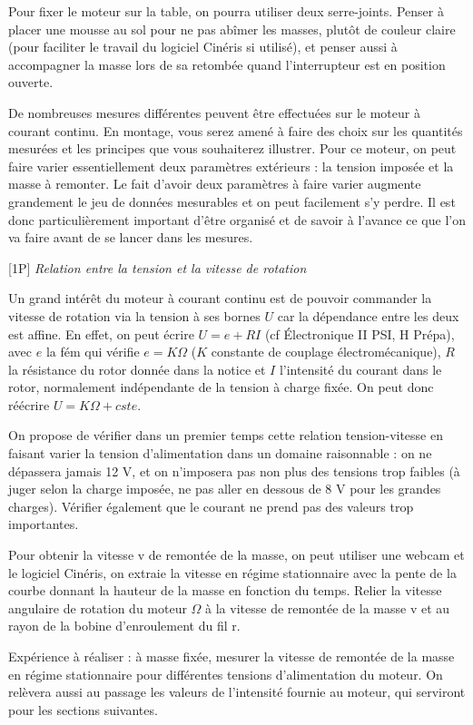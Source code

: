 \documentclass{article}%
\begin{document}
Pour fixer le moteur sur la table, on pourra utiliser deux serre-joints. Penser à placer une mousse au sol pour ne pas abîmer les masses, plutôt de couleur claire (pour faciliter le travail du logiciel Cinéris si utilisé), et penser aussi à accompagner la masse lors de sa retombée quand l'interrupteur est en position ouverte.

De nombreuses mesures différentes peuvent être effectuées sur le moteur à courant continu. En montage, vous serez amené à faire des choix sur les quantités mesurées et les principes que vous souhaiterez illustrer. Pour ce moteur, on peut faire varier essentiellement deux paramètres extérieurs : la tension imposée et la masse à remonter. Le fait d'avoir deux paramètres à faire varier augmente grandement le jeu de données mesurables et on peut facilement s'y perdre. Il est donc particulièrement important d'être organisé et de savoir à l'avance ce que l'on va faire avant de se lancer dans les mesures.

[1P] \textit{Relation entre la tension et la vitesse de rotation}

Un grand intérêt du moteur à courant continu est de pouvoir commander la vitesse de rotation via la tension à ses bornes $U$ car la dépendance entre les deux est affine. En effet, on peut écrire $U = e + RI$ (cf Électronique II PSI, H Prépa), avec $e$ la fém qui vérifie $e = K \Omega$ ($K$ constante de couplage électromécanique), $R$ la résistance du rotor donnée dans la notice et $I$ l'intensité du courant dans le rotor, normalement indépendante de la tension à charge fixée. On peut donc réécrire $U = K \Omega + cste$.

On propose de vérifier dans un premier temps cette relation tension-vitesse en faisant varier la tension d'alimentation dans un domaine raisonnable : on ne dépassera jamais 12 V, et on n'imposera pas non plus des tensions trop faibles (à juger selon la charge imposée, ne pas aller en dessous de 8 V pour les grandes charges). Vérifier également que le courant ne prend pas des valeurs trop importantes.

Pour obtenir la vitesse v de remontée de la masse, on peut utiliser une webcam et le logiciel Cinéris, on extraie la vitesse en régime stationnaire avec la pente de la courbe donnant la hauteur de la masse en fonction du temps. Relier la vitesse angulaire de rotation du moteur $\Omega$ à la vitesse de remontée de la masse v et au rayon de la bobine d'enroulement du fil r.

Expérience à réaliser : à masse fixée, mesurer la vitesse de remontée de la masse en régime stationnaire pour différentes tensions d'alimentation du moteur. On relèvera aussi au passage les valeurs de l'intensité fournie au moteur, qui serviront pour les sections suivantes.
\end{document}
